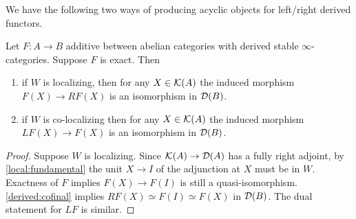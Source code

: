\documentclass{article}
\begin{document}
We have the following two ways of producing acyclic objects
for left/right derived functors.
\begin{prop}
  Let $F : A \to B$ additive between abelian categories with
  derived stable $\infty$-categories.
  Suppose $F$ is exact.
  Then \begin{enumerate}
    \item if $W$ is localizing, then for any $X \in \mathcal{K}(A)$
    the induced morphism $F(X) \to RF(X)$ is an isomorphism in $\mathcal{D}(B)$.
    \item if $W$ is co-localizing then for any $X \in \mathcal{K}(A)$
    the induced morphism $LF(X) \to F(X)$ is an isomorphism in $\mathcal{D}(B)$.
  \end{enumerate}
\end{prop}
\begin{proof}
  Suppose $W$ is localizing.
  Since $\mathcal{K}(A) \to \mathcal{D}(A)$ has a fully right adjoint,
  by \ref{local:fundamental} 
  the unit $X \to I$ of the adjunction at $X$ must be in $W$.
  Exactness of $F$ implies $F(X) \to F(I)$ is still a quasi-isomorphism.
  \ref{derived:cofinal} implies $RF(X) \simeq F(I) \simeq F(X)$ in $\mathcal{D}(B)$.
  The dual statement for $LF$ is similar.
\end{proof}
\end{document}
